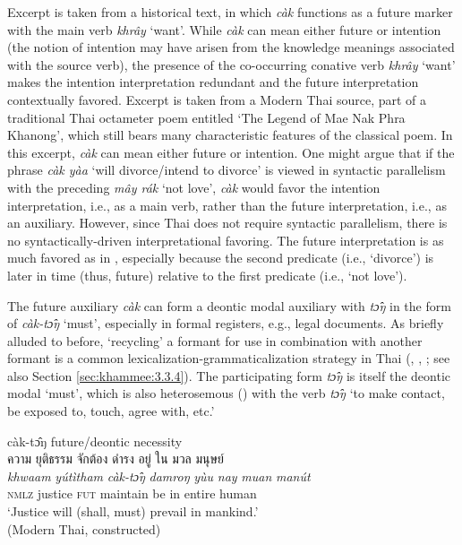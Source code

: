 \documentclass[output=paper,colorlinks,citecolor=brown]{langscibook}
\begin{document}
Excerpt  is taken from a historical text, in which\textit{ càk} functions as a future marker with the main verb \textit{khrây} ‘want’. While \textit{càk} can mean either future or intention (the notion of intention may have arisen from the knowledge meanings associated with the source verb), the presence of the co-occurring conative verb \textit{khrây} ‘want’ makes the intention interpretation redundant and the future interpretation contextually favored. Excerpt  is taken from a Modern Thai source, part of a traditional Thai octameter poem entitled ‘The Legend of Mae Nak Phra Khanong’, which still bears many characteristic features of the classical poem. In this excerpt, \textit{càk} can mean either future or intention. One might argue that if the phrase \textit{càk yàa }‘will divorce/intend to divorce’ is viewed in syntactic parallelism with the preceding \textit{mây rák }‘not love’, \textit{càk} would favor the intention interpretation, i.e., as a main verb, rather than the future interpretation, i.e., as an auxiliary. However, since Thai does not require syntactic parallelism, there is no syntactically-driven interpretational favoring. The future interpretation is as much favored as in , especially because the second predicate (i.e., ‘divorce’) is later in time (thus, future) relative to the first predicate (i.e., ‘not love’). 

The future auxiliary \textit{càk} can form a deontic modal auxiliary with \textit{tɔ̂ŋ} in the form of \textit{càk-tɔ̂ŋ }‘must’, especially in formal registers, e.g., legal documents. As briefly alluded to before, ‘recycling’ a formant for use in combination with another formant is a common lexicalization-grammaticalization strategy in Thai (\cite{RheeKhammee2022}, \cite{KhammeeRhee2022}, \cite{ThirakunkovitRhee2023}; see also  Section \ref{sec:khammee:3.3.4}). The participating form \textit{tɔ̂ŋ} is itself the deontic modal ‘must’, which is also heterosemous (\cite{Lichtenberk1991}) with the verb \textit{tɔ̂ŋ} ‘to make contact, be exposed to, touch, agree with, etc.’ 

\ea \label{ex:3} càk-tɔ̂ŋ future/deontic necessity\\
    \textthai{ความ} \textthai{ยุติธรรม} \textthai{จักต้อง} \textthai{ดำรง} \textthai{อยู่} \textthai{ใน} \textthai{มวล} \textthai{มนุษย์}\\
         \gll \textit{khwaam} \textit{yútìtham} \textit{càk-tɔ̂ŋ} \textit{damroŋ} \textit{yùu} \textit{nay} \textit{muan} \textit{manút}\\
         \textsc{nmlz} justice \textsc{fut} maintain be in entire human\\
    \glt ‘Justice will (shall, must) prevail in mankind.’\\
    \hfill (Modern Thai, constructed)
\z
\end{document}
